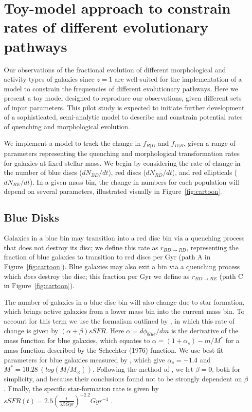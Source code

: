 \documentclass[useAMS,usenatbib]{mn2e}
\begin{document}

  


\newpage
\clearpage

\appendix

\section{Toy-model approach to constrain rates of different evolutionary pathways}

Our observations of the fractional evolution of different morphological and activity types of galaxies since $z=1$ are well-suited for the implementation of a model to constrain the frequencies of different evolutionary pathways. Here we present a toy model designed to reproduce our observations, given different sets of input parameters. This pilot study is expected to initiate further development of a sophisticated, semi-analytic model to describe and constrain potential rates of quenching and morphological evolution. 

We implement a model to track the change in $f_{R|D}$ and $f_{D|R}$, given a range of parameters representing the quenching and morphological transformation rates for galaxies at fixed stellar mass. We begin by considering the rate of change in the number of blue discs ($dN_{BD}/dt$), red discs ($dN_{RD}/dt$), and red ellipticals ($dN_{RE}/dt$). In a given mass bin, the change in numbers for each population will depend on several parameters, illustrated visually in Figure~\ref{fig:cartoon}.

\subsection{Blue Disks}

Galaxies in a blue bin may transition into a red disc bin via a quenching process that does not destroy its disc; we define this rate as $r_{BD \rightarrow RD}$, representing the fraction of blue galaxies to transition to red discs per Gyr (path A in Figure~\ref{fig:cartoon}). Blue galaxies may also exit a bin via a quenching process which \emph{does} destroy the disc; this fraction per Gyr we define as $r_{BD \rightarrow RE}$ (path C in Figure~\ref{fig:cartoon}).

The number of galaxies in a blue disc bin will also change due to star formation, which brings active galaxies from a lower mass bin into the current mass bin. To account for this term we use the formalism outlined by \citet{Peng2010}, in which this rate of change is given by $(\alpha + \beta)sSFR$. Here $\alpha = d\phi_{blue}/dm$ is the derivative of the mass function for blue galaxies, which equates to $\alpha = (1+\alpha_s) - m/M^*$ for a mass function described by the Schechter (1976) function. We use best-fit parameters for blue galaxies measured by \citet{Ichikawa2017}, which give $\alpha_s = -1.4$ and $M^* = 10.28 ~(log(M/M_{\odot}))$. Following the method of \citet{Peng2010}, we let $\beta=0$, both for simplicity, and because their conclusions found not to be strongly dependent on $\beta$. Finally, the specific star-formation rate is given by $sSFR(t) = 2.5(\frac{t}{3.5 Gyr})^{-2.2}Gyr^{-1}$ \citep{Peng2010}.
\end{document}

